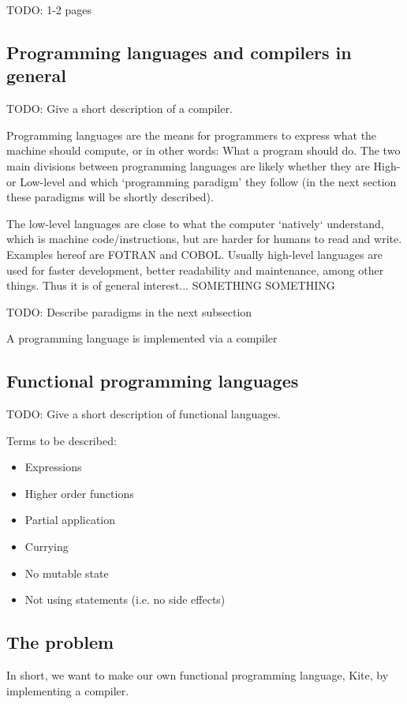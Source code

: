 TODO: 1-2 pages
\subsection{Programming languages and compilers in general}
TODO: Give a short description of a compiler.


Programming languages are the means for programmers to express what the machine should compute, or in other words: What a program should do.
The two main divisions between programming languages are likely whether they are High- or Low-level and which `programming paradigm' they follow (in the next section these paradigms will be shortly described).

The low-level languages are close to what the computer `natively` understand, which is machine code/instructions, but are harder for humans to read and write. Examples hereof are FOTRAN and COBOL. Usually high-level languages are used for faster development, better readability and maintenance, among other things. Thus it is of general interest... SOMETHING SOMETHING


TODO: Describe paradigms in the next subsection

A programming language is implemented via a compiler

\subsection{Functional programming languages}
TODO: Give a short description of functional languages.


Terms to be described:
\begin{itemize}
\item Expressions
\item Higher order functions
\item Partial application
\item Currying
\item No mutable state
\item Not using statements (i.e. no side effects)

\end{itemize}

\subsection{The problem}
In short, we want to make our own functional programming language, Kite, by implementing a compiler.


